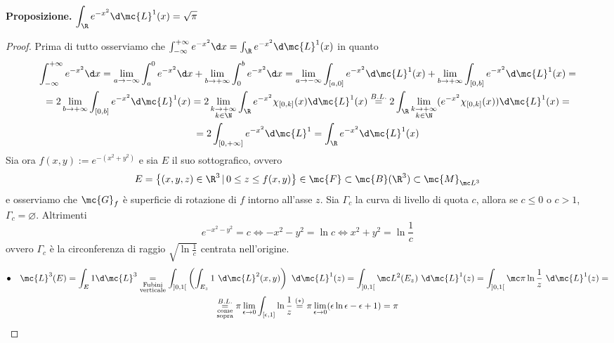 \begin{tcolorbox}[
    colframe=yellow!30!green, 
    colback = white,
    enhanced jigsaw, breakable,
    arc=0mm, 
    rightrule=0mm,
    toprule=0mm,
    titlerule=0mm,
    bottomrule=0mm,
    left = 1mm,
    top = 1mm,
    bottom = 1mm,
    right = 1mm,
    bottomrule at break=0mm,
    ]
    \textbf{\color{yellow!30!green}Proposizione. } $\displaystyle \int_\R e^{-x^2}\d\mc{L}^1(x) = \sqrt{\pi}$
\end{tcolorbox}
\begin{proof}
    Prima di tutto osserviamo che $\int_{-\infty}^{+
    \infty}e^{-x^2}\d x = \int_\R e^{-x^2}\d\mc{L}^1(x)$ in quanto
    \begin{gather*}\int_{-\infty}^{+\infty}e^{-x^2}\d x = \lim_{a\to -\infty}\int_a^0e^{-x^2}\d x + \lim_{b\to +\infty}\int_0^be^{-x^2}\d x = \lim_{a\to -\infty}\int_{[a,0]}e^{-x^2}\d \mc{L}^1(x) + \lim_{b\to +\infty}\int_{[0,b]}e^{-x^2}\d \mc{L}^1(x) = \\ = 2\lim_{b\to +\infty}\int_{[0,b]}e^{-x^2}\d \mc{L}^1(x) = 2 \lim_{\substack{k\to +\infty\\k\in \N}}\int_\R e^{-x^2}\chi_{[0,k]}(x)\d \mc{L}^1(x) \overset{B.L.}{=}2 \int_\R \lim_{\substack{k\to +\infty\\k\in \N}}(e^{-x^2}\chi_{[0,k]}(x))\d \mc{L}^1(x) = \\= 2\int_{[0,+\infty]} e^{-x^2}\d\mc{L}^{1} = \int_\R e^{-x^2}\d\mc{L}^1(x)\end{gather*}
    Sia ora $f(x,y):=e^{-(x^2+y^2)}$ e sia $E$ il suo sottografico, ovvero 
    \[E = \left\{(x,y,z)\in \R^3\,|\,0\leq z \leq f(x,y)\right\}\in \mc{F}\subset \mc{B}(\R^3)\subset \mc{M}_{\mc L^3}\]
    e osserviamo che $\mc{G}_f$ è superficie di rotazione di $f$ intorno all'asse $z$. Sia $\Gamma_c$ la curva di livello di quota $c$, allora se $c\leq 0$ o $c>1$, $\Gamma_c = \varnothing$. Altrimenti
    \[e^{-x^2-y^2} = c \iff  -x^2-y^2 = \ln c \iff x^2+y^2 = \ln\frac{1}{c}\]
    ovvero $\Gamma_c$ è la circonferenza di raggio $\sqrt{\ln\frac{1}{c}}$ centrata nell'origine.
    \begin{multline*}\bullet \quad \mc{L}^3(E) = \int_E1\d\mc{L}^3 \underset{\substack{\text{Fubini}\\\text{verticale}}}{=} \int_{]0,1[}\left(\int_{E_z}1\ \d \mc{L}^2(x,y)\right)\ \d \mc{L}^1(z) = \int_{]0,1[}\mc L^2(E_z)\ \d \mc{L}^1(z) = \int_{]0,1[}\mc \pi\ln\frac{1}{z}\ \d \mc{L}^1(z) =\\ \underset{\substack{\text{come}\\\text{sopra}}}{\overset{B.L.}{=}} \pi \lim_{\epsilon \to 0}\int_{[\epsilon,1]}\ln\frac{1}{z} \overset{(*)}{=} \pi\lim_{\epsilon \to 0}(\epsilon \ln\epsilon -\epsilon +1) = \pi\end{multline*}

\end{proof}
